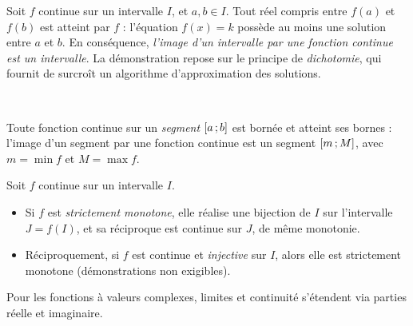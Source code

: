 \noindent
\begin{minipage}[c]{0.56\linewidth}
\begin{theoreme}
Soit $f$ continue sur un intervalle $I$, et $a,b\in I$. Tout réel compris
entre $f(a)$ et $f(b)$ est atteint par $f$ : l'équation $f(x)=k$ possède au
moins une solution entre $a$ et $b$. En conséquence, \emph{l'image d'un
intervalle par une fonction continue est un intervalle}. La démonstration
repose sur le principe de \emph{dichotomie}, qui fournit de surcroît un
algorithme d'approximation des solutions.
\end{theoreme}
\end{minipage}\hfill
\begin{minipage}[c]{0.4\linewidth}
\centering
{}\\[0.5mm]
\end{minipage}

\begin{theoreme}
Toute fonction continue sur un \emph{segment} $\mathopen{[}a\,{;}\,b\mathclose{]}$ est bornée et
atteint ses bornes : l'image d'un segment par une fonction continue est un
segment $\mathopen{[}m\,{;}\,M\mathclose{]}$, avec $m=\min f$ et $M=\max f$.
\end{theoreme}

\begin{theoreme}
Soit $f$ continue sur un intervalle $I$.
\begin{itemize}[label={\color{otNavy}\textbullet},leftmargin=1.4em,itemsep=0.6mm,topsep=0.8mm]
  \item Si $f$ est \emph{strictement monotone}, elle réalise une bijection
    de $I$ sur l'intervalle $J=f(I)$, et sa réciproque est continue sur
    $J$, de même monotonie.
  \item Réciproquement, si $f$ est continue et \emph{injective} sur $I$,
    alors elle est strictement monotone (démonstrations non exigibles).
\end{itemize}
Pour les fonctions à valeurs complexes, limites et continuité s'étendent via
parties réelle et imaginaire.
\end{theoreme}


